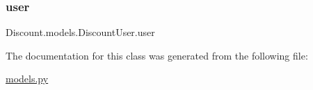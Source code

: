 \subsubsection{\texorpdfstring{user}{user}}
{\footnotesize\ttfamily Discount.\+models.\+Discount\+User.\+user\hspace{0.3cm}{\ttfamily [static]}}



The documentation for this class was generated from the following file\+:\begin{DoxyCompactItemize}
\item 
\hyperlink{models_8py}{models.\+py}\end{DoxyCompactItemize}
